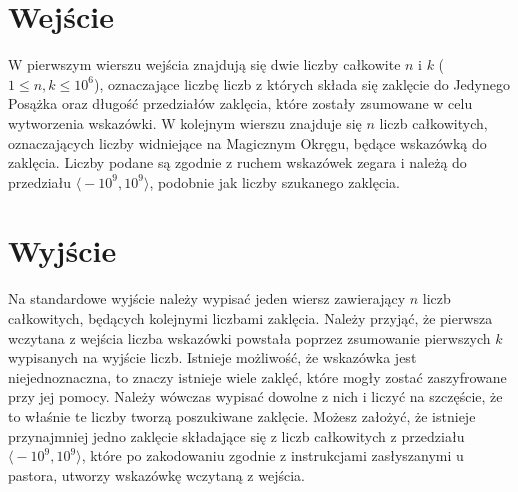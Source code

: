 \documentclass[zad,zawodnik,utf8]{sinol}
\begin{document}
\begin{tasktext}
 \section{Wejście}
    
W pierwszym wierszu wejścia znajdują się dwie liczby całkowite $n$ i $k$ ($1 \leq n, k \leq 10^6$), oznaczające liczbę liczb z których składa się zaklęcie do Jedynego Posążka
oraz długość przedziałów zaklęcia, które zostały zsumowane w celu wytworzenia wskazówki. 
W kolejnym wierszu znajduje się $n$ liczb całkowitych, oznaczających liczby widniejące na Magicznym Okręgu, będące wskazówką do zaklęcia. Liczby podane są zgodnie z ruchem
wskazówek zegara i należą do przedziału $\big \langle-10^9, 10^9\big \rangle$, podobnie jak liczby szukanego zaklęcia.

  \section{Wyjście}
    Na standardowe wyjście należy wypisać jeden wiersz zawierający $n$ liczb całkowitych, będących kolejnymi liczbami zaklęcia. Należy przyjąć, że pierwsza wczytana z wejścia
liczba wskazówki powstała poprzez zsumowanie pierwszych $k$ wypisanych na wyjście liczb. Istnieje możliwość, że wskazówka jest niejednoznaczna, to znaczy istnieje wiele
zaklęć, które mogły zostać zaszyfrowane przy jej pomocy. Należy wówczas wypisać dowolne z nich i liczyć na szczęście, że to właśnie te liczby tworzą poszukiwane zaklęcie. 
Możesz założyć, że istnieje przynajmniej jedno zaklęcie składające się z liczb całkowitych z przedziału $\big \langle-10^9, 10^9\big \rangle$, które po zakodowaniu zgodnie
z instrukcjami zasłyszanymi u pastora, utworzy wskazówkę wczytaną z wejścia. 

    \makecompactexample

  \end{tasktext}
\end{document}
